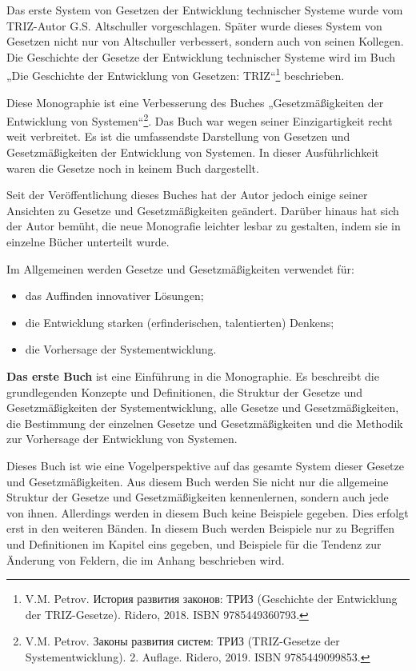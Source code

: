 \documentclass[11pt,a4paper]{article}
\begin{document}
Das erste System von Gesetzen der Entwicklung technischer Systeme wurde vom
TRIZ-Autor G.S. Altschuller vorgeschlagen. Später wurde dieses System von
Gesetzen nicht nur von Altschuller verbessert, sondern auch von seinen
Kollegen. Die Geschichte der Gesetze der Entwicklung technischer Systeme wird
im Buch „Die Geschichte der Entwicklung von Gesetzen:
TRIZ“\footnote{V.M. Petrov. \foreignlanguage{russian}{История развития
    законов: ТРИЗ} (Geschichte der Entwicklung der TRIZ-Gesetze).  Ridero,
  2018. ISBN 9785449360793.} beschrieben.

Diese Monographie ist eine Verbesserung des Buches „Gesetzmäßigkeiten der
Entwicklung von Systemen“\footnote{V.M. Petrov.
  \foreignlanguage{russian}{Законы развития систем: ТРИЗ} (TRIZ-Gesetze der
  Systementwicklung). 2. Auflage. Ridero, 2019.  ISBN 9785449099853.}.  Das
Buch war wegen seiner Einzigartigkeit recht weit verbreitet. Es ist die
umfassendste Darstellung von Gesetzen und Gesetzmäßigkeiten der Entwicklung
von Systemen. In dieser Ausführlichkeit waren die Gesetze noch in keinem Buch
dargestellt.

Seit der Veröffentlichung dieses Buches hat der Autor jedoch einige seiner
Ansichten zu Gesetze und Gesetzmäßigkeiten geändert. Darüber hinaus hat sich
der Autor bemüht, die neue Monografie leichter lesbar zu gestalten, indem sie
in einzelne Bücher unterteilt wurde.

Im Allgemeinen werden Gesetze und Gesetzmäßigkeiten verwendet für:
\begin{itemize}[noitemsep]
  \item das Auffinden innovativer Lösungen;
  \item die Entwicklung starken (erfinderischen, talentierten) Denkens;
  \item die Vorhersage der Systementwicklung.
\end{itemize}
\textbf{Das erste Buch} ist eine Einführung in die Monographie. Es beschreibt
die grundlegenden Konzepte und Definitionen, die Struktur der Gesetze und
Gesetzmäßigkeiten der Systementwicklung, alle Gesetze und Gesetzmäßigkeiten,
die Bestimmung der einzelnen Gesetze und Gesetzmäßigkeiten und die Methodik
zur Vorhersage der Entwicklung von Systemen.

Dieses Buch ist wie eine Vogelperspektive auf das gesamte System dieser
Gesetze und Gesetzmäßigkeiten. Aus diesem Buch werden Sie nicht nur die
allgemeine Struktur der Gesetze und Gesetzmäßigkeiten kennenlernen, sondern
auch jede von ihnen. Allerdings werden in diesem Buch keine Beispiele gegeben.
Dies erfolgt erst in den weiteren Bänden. In diesem Buch werden Beispiele nur
zu Begriffen und Definitionen im Kapitel eins gegeben, und Beispiele für die
Tendenz zur Änderung von Feldern, die im Anhang beschrieben wird.
\end{document}
